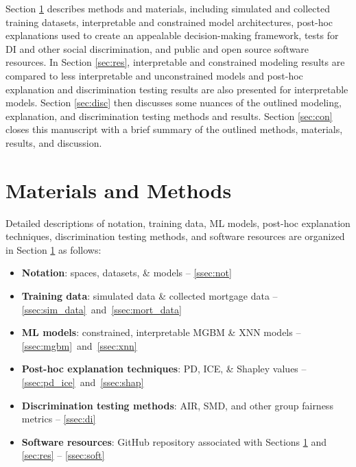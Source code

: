 \documentclass[information,article,submit,moreauthors,pdftex]{definitions/mdpi}
\begin{document}
Section \ref{sec:m_and_m} describes methods and materials, including simulated and collected training datasets, interpretable and constrained model architectures, post-hoc explanations used to create an appealable decision-making framework, tests for DI and other social discrimination, and public and open source software resources. In Section \ref{sec:res}, interpretable and constrained modeling results are compared to less interpretable and unconstrained models and post-hoc explanation and discrimination testing results are also presented for interpretable models. Section \ref{sec:disc} then discusses some nuances of the outlined modeling, explanation, and discrimination testing methods and results. Section \ref{sec:con} closes this manuscript with a brief summary of the outlined methods, materials, results, and discussion.

\section{Materials and Methods}\label{sec:m_and_m}

Detailed descriptions of notation, training data, ML models, post-hoc explanation techniques, discrimination testing methods, and software resources are organized in Section \ref{sec:m_and_m} as follows:

\begin{itemize}[leftmargin=*,labelsep=5.8mm]
	\item \textbf{Notation}: spaces, datasets, \& models -- \textsection\ref{ssec:not}
	\item \textbf{Training data}: simulated data \& collected mortgage data -- \textsection\ref{ssec:sim_data}~and~\textsection\ref{ssec:mort_data}
	\item \textbf{ML models}: constrained, interpretable MGBM \& XNN models  -- \textsection\ref{ssec:mgbm}~and~\textsection\ref{ssec:xnn}
	\item \textbf{Post-hoc explanation techniques}: PD, ICE, \& Shapley values -- \textsection\ref{ssec:pd_ice}~and~\textsection\ref{ssec:shap}
	\item \textbf{Discrimination testing methods}: AIR, SMD, and other group fairness metrics -- \textsection\ref{ssec:di}
	\item \textbf{Software resources}: GitHub repository associated with Sections \ref{sec:m_and_m} and \ref{sec:res} -- \textsection\ref{ssec:soft}
\end{itemize}
\end{document}
